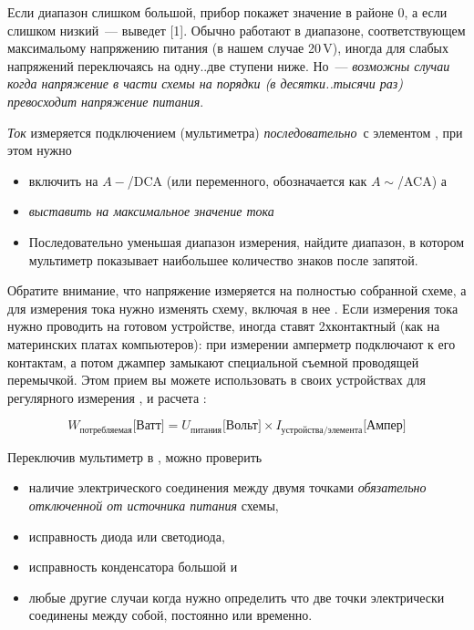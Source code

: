 Если диапазон
слишком большой, прибор покажет значение в районе 0, а если слишком низкий\ ---
выведет [1]. Обычно работают в диапазоне, соответствующем максимальому
напряжению питания (в нашем случае 20\,V), иногда для
слабых напряжений переключаясь на одну..две ступени ниже. Но\ ---
\emph{возможны случаи когда напряжение в части схемы на порядки (в десятки..тысячи
раз) превосходит напряжение питания}.

\begin{framed}
\emph{Ток} измеряется  подключением  (мультиметра) \emph{последовательно}\ с элементом , при этом
нужно
\begin{itemize}
\item
{} включить на
 $A-$/DCA (или переменного, обозначается
как $A\sim$/ACA) а
  \item {} \emph{выставить на максимальное значение тока}
\item 
Последовательно уменьшая диапазон измерения, найдите диапазон, в котором
мультиметр показывает наибольшее количество знаков после запятой. 
\end{itemize}
\end{framed}

Обратите внимание, что напряжение измеряется  на полностью
собранной схеме, а для измерения тока нужно изменять схему, включая в нее
. Если измерения тока нужно проводить на готовом устройстве,
иногда ставят 2хконтактный  (как на материнских платах
компьютеров): при измерении амперметр подключают к его контактам, а потом
джампер замыкают специальной съемной проводящей перемычкой. Этом прием вы можете
использовать в своих устройствах для регулярного измерения , и расчета :

\begin{equation}
W_{\mbox{потребляемая}}\mbox{[Ватт]} = 
U_{\mbox{питания}}\mbox{[Вольт]} 
\times
I_{\mbox{устройства/элемента}}\mbox{[Ампер]}
\end{equation}

\begin{framed}
Переключив мультиметр в , можно проверить
\begin{itemize} 
\item наличие
электрического соединения между двумя точками \emph{обязательно отключенной от
источника питания} схемы,
\item исправность диода или светодиода,
\item исправность конденсатора большой  и
\item любые другие случаи когда нужно определить что две точки электрически
соединены между собой, постоянно или временно.
\end{itemize}
\end{framed}

